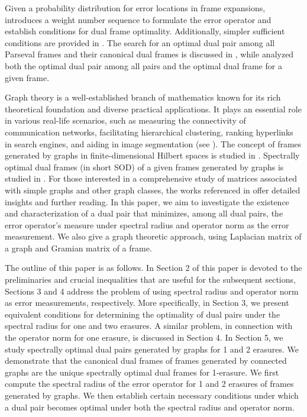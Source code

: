 \documentclass[final,1p,times]{elsarticle}
\begin{document}
	Given a probability distribution for error locations in frame expansions, \cite{leng3} introduces a weight number sequence to formulate the error operator and establish conditions for dual frame optimality. Additionally, simpler sufficient conditions are provided in \cite{li1}. The search for an optimal dual pair among all Parseval frames and their canonical dual frames is discussed in \cite{leng, li}, while \cite{shan} analyzed both the optimal dual pair among all pairs and the optimal dual frame for a given frame. 
	
	Graph theory is a well-established branch of mathematics known for its rich theoretical foundation and diverse practical applications. It plays an essential role in various real-life scenarios, such as measuring the connectivity of communication networks, facilitating hierarchical clustering, ranking hyperlinks in search engines, and aiding in image segmentation (see \cite{nisan, biggs, shi}). The	concept of frames generated by graphs in finite-dimensional Hilbert spaces is studied in \cite{deep1}. Spectrally optimal dual frames (in short SOD) of a given frames generated by graphs is studied in \cite{deep2}. For those interested in a comprehensive study of matrices associated with simple graphs and other graph classes, the works referenced in \cite{bapat, bapat1, guo, mehat, zas}  offer detailed insights and further reading. In this paper, we aim to investigate the existence and characterization of a dual pair that minimizes, among all dual pairs, the  error operator’s measure under spectral radius and operator norm as the error measurement. We also give a graph theoretic approach, using Laplacian matrix of a graph and Gramian matrix of a frame.
	
The outline of this paper is as follows. In Section 2 of this paper is devoted to the preliminaries and crucial inequalities that are useful for the subsequent sections, Sections 3 and 4 address the problem of using spectral radius and operator norm as error measurements, respectively. More specifically, in Section 3, we present equivalent conditions for determining the optimality of dual pairs under the spectral radius for one and two erasures. A similar problem, in connection with the operator norm for one erasure, is discussed in Section 4. In Section 5, we study spectrally optimal dual pairs generated by graphs for 1 and 2 erasures. We demonstrate that the canonical dual frames of frames generated by connected graphs are the unique spectrally optimal dual frames for 1-erasure. We first compute the spectral radius of the error operator for 1 and 2 erasures of frames generated by graphs. We then establish certain necessary conditions under which a dual pair becomes optimal under both the spectral radius and operator norm.
	
\end{document}

